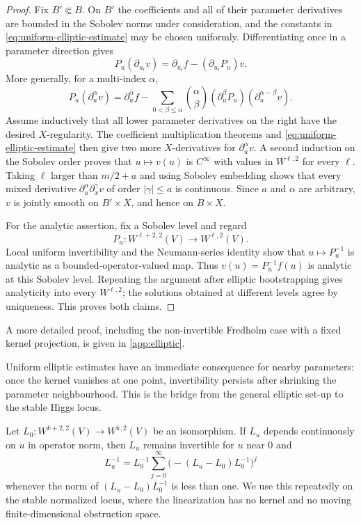 \documentclass[11pt,reqno]{amsart}
\theoremstyle{definition}
\theoremstyle{remark}
\begin{document}
\begin{proof}
Fix $B'\Subset B$.  On $B'$ the coefficients and all of their parameter
derivatives are bounded in the Sobolev norms under consideration, and
the constants in \eqref{eq:uniform-elliptic-estimate} may be chosen
uniformly.  Differentiating once in a parameter direction gives
\[
  P_u(\partial_{u_i}v)
  =\partial_{u_i}f-(\partial_{u_i}P_u)v.
\]
More generally, for a multi-index $\alpha$,
\[
 P_u(\partial_u^\alpha v)
 =\partial_u^\alpha f
  -\sum_{0<\beta\le\alpha}\binom{\alpha}{\beta}
    (\partial_u^\beta P_u)
    (\partial_u^{\alpha-\beta}v).
\]
Assume inductively that all lower parameter derivatives on the right
have the desired $X$-regularity.  The coefficient multiplication
theorems and \eqref{eq:uniform-elliptic-estimate} then give two more
$X$-derivatives for $\partial_u^\alpha v$.  A second induction on the
Sobolev order proves that $u\mapsto v(u)$ is $C^\infty$ with values in
$W^{\ell,2}$ for every $\ell$.  Taking $\ell$ larger than
$m/2+a$ and using Sobolev embedding shows that every mixed derivative
$\partial_u^\alpha\partial_x^\gamma v$ of order $|\gamma|\le a$ is
continuous.  Since $a$ and $\alpha$ are arbitrary, $v$ is jointly
smooth on $B'\times X$, and hence on $B\times X$.

For the analytic assertion, fix a Sobolev level and regard
\[
 P_u:W^{\ell+2,2}(V)\longrightarrow W^{\ell,2}(V).
\]
Local uniform invertibility and the Neumann-series identity show that
$u\mapsto P_u^{-1}$ is analytic as a bounded-operator-valued map.  Thus
$v(u)=P_u^{-1}f(u)$ is analytic at this Sobolev level.  Repeating the
argument after elliptic bootstrapping gives analyticity into every
$W^{\ell,2}$; the solutions obtained at different levels agree by
uniqueness.  This proves both claims.
\end{proof}

A more detailed proof, including the non-invertible Fredholm case with a fixed kernel projection, is given in \cref{app:elliptic}.


Uniform elliptic estimates have an immediate consequence for nearby parameters: once the kernel vanishes at one point, invertibility persists after shrinking the parameter neighbourhood.  This is the bridge from the general elliptic set-up to the stable Higgs locus.


Let $L_0:W^{k+2,2}(V)\to W^{k,2}(V)$ be an isomorphism.  If $L_u$ depends continuously on $u$ in operator norm, then $L_u$ remains invertible for $u$ near $0$ and
\begin{equation}\label{eq:inverse-neumann}
  L_u^{-1}
  =L_0^{-1}\sum_{j=0}^\infty
  \bigl(-(L_u-L_0)L_0^{-1}\bigr)^j
\end{equation}
whenever the norm of $(L_u-L_0)L_0^{-1}$ is less than one.  We use this repeatedly on the stable normalized locus, where the linearization has no kernel and no moving finite-dimensional obstruction space.
\end{document}
